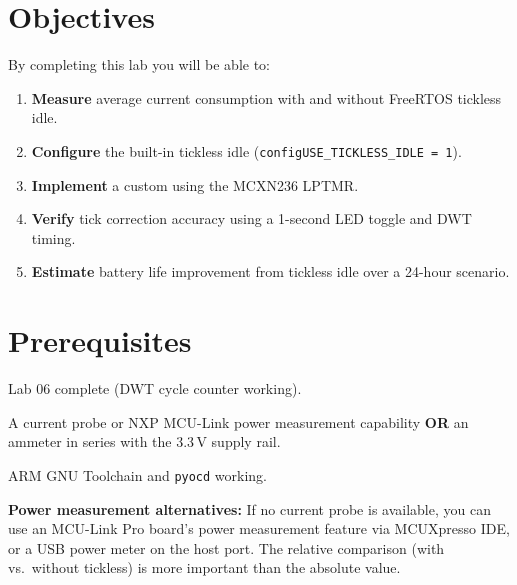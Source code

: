 \documentclass[11pt, a4paper]{article}
\begin{document}

\section{Objectives}

By completing this lab you will be able to:

\begin{enumerate}[noitemsep, leftmargin=*]
  \item \textbf{Measure} average current consumption with and without FreeRTOS tickless
        idle.
  \item \textbf{Configure} the built-in tickless idle
        (\texttt{configUSE\_TICKLESS\_IDLE\,=\,1}).
  \item \textbf{Implement} a custom  using the MCXN236
        LPTMR.
  \item \textbf{Verify} tick correction accuracy using a 1-second LED toggle and DWT
        timing.
  \item \textbf{Estimate} battery life improvement from tickless idle over a 24-hour
        scenario.
\end{enumerate}

\section{Prerequisites}

\begin{checklist}
  \item Lab 06 complete (DWT cycle counter working).
  \item A current probe or NXP MCU-Link power measurement capability \textbf{OR} an
        ammeter in series with the 3.3\,V supply rail.
  \item ARM GNU Toolchain and \texttt{pyocd} working.
\end{checklist}

\begin{warnbox}
  \textbf{Power measurement alternatives:} If no current probe is available, you can
  use an MCU-Link Pro board's power measurement feature via MCUXpresso IDE, or a USB
  power meter on the host port. The relative comparison (with vs.\ without tickless)
  is more important than the absolute value.
\end{warnbox}
\end{document}
